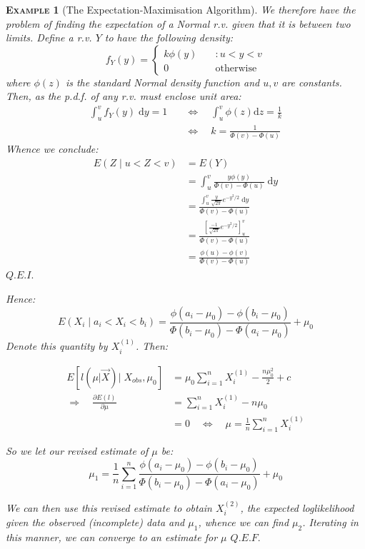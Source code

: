 \documentclass[12pt,a4paper]{article}
\newtheorem{example}{\textsc{Example}}[section]
\newcommand{\diff}{\mathrm{d}}
\begin{document}
\begin{example}[The Expectation-Maximisation Algorithm]
We therefore have the problem of finding the expectation of a Normal r.v. given that it is between two limits. Define a r.v. $Y$ to have the following density:
$$f_Y(y) = \left\{ \begin{array}{cl} k\phi(y)\quad& : u<y<v\\ 0 \quad& \mbox{otherwise}\end{array}\right.$$
where $\phi(z)$ is the standard Normal density function and $u,v$ are constants. Then, as the p.d.f. of any r.v. must enclose unit area:
\begin{align*}
\int_u^v\!\! f_Y(y)\;\diff y = 1 \quad &\Leftrightarrow\quad \int_u^v \!\! \phi(z) \diff z = \frac{1}{k}\\
&\Leftrightarrow\quad k = \frac{1}{\Phi(v) - \Phi(u)}
\end{align*}
Whence we conclude:
\begin{align*}
E(Z \mid u<Z<v) &= E(Y)\\
&= \int_u^v \!\! \frac{y\phi(y)}{\Phi(v)-\Phi(u)}\;\diff y\\
&= \frac{\int_u^v \!\! \frac{y}{\sqrt{2\pi}} e^{-y^2/2}\;\diff y}{\Phi(v)-\Phi(u)}\\
&= \frac{\left[\frac{-1}{\sqrt{2\pi}}e^{-y^2/2}\right]_u^v}{\Phi(v)-\Phi(u)}\\
&= \frac{\phi(u)-\phi(v)}{\Phi(v)-\Phi(u)}
\end{align*}\hfill$Q.E.I.$

\noindent Hence:
$$E(X_i \mid a_i< X_i<b_i) = \frac{\phi(a_i-\mu_0)-\phi(b_i-\mu_0)}{\Phi(b_i-\mu_0)-\Phi(a_i-\mu_0)}+\mu_0$$
Denote this quantity by $X_i^{(1)}$. Then:

\begin{align*}
E\left[l\left(\mu | \vec{X}\right) \bigg| \; X_{obs},\mu_0\right] &= \mu_0 \sum_{i=1}^n X_i^{(1)} - \frac{n\mu_0^2}{2} + c\\
\Rightarrow\quad \frac{\partial E(l)}{\partial \mu} &= \sum_{i=1}^n X_i^{(1)} - n\mu_0\\
&= 0 \quad\Leftrightarrow\quad \mu = \frac{1}{n}\sum_{i=1}^n X_i^{(1)}
\end{align*}

So we let our revised estimate of $\mu$ be:
$$\mu_1 = \frac{1}{n} \sum_{i=1}^n \frac{\phi(a_i-\mu_0)-\phi(b_i-\mu_0)}{\Phi(b_i-\mu_0)-\Phi(a_i-\mu_0)}+\mu_0$$

We can then use this revised estimate to obtain $X_i^{(2)}$, the expected loglikelihood given the observed (incomplete) data and $\mu_1$, whence we can find $\mu_2$. Iterating in this manner, we can converge to an estimate for $\mu$ \hfill$Q.E.F.$

\end{example}
\end{document}
